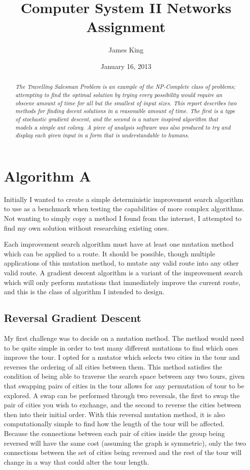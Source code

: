 \documentclass[a4paper,11pt]{article}
\title{Computer System II Networks Assignment}
\date{January 16, 2013}
\author{James King}
\begin{document}
\maketitle

\begin{abstract}
\emph{The Travelling Salesman Problem is an example of the NP-Complete class of
problems; attempting to find the optimal solution by trying every possibility
would require an obscene amount of time for all but the smallest of input
sizes. This report describes two methods for finding decent solutions in a 
reasonable amount of time. The first is a type of stochastic gradient descent,
and the second is a nature inspired algorithm that models a simple ant colony.
A piece of analysis software was also produced to try and display each given
input in a form that is understandable to humans.}
\end{abstract}

\section{Algorithm A}
Initially I wanted to create a simple deterministic improvement search
algorithm to use as a benchmark when testing the capabilities of more complex
algorithms. Not wanting to simply copy a method I found from the internet, I
attempted to find my own solution without researching existing ones.

Each improvement search algorithm must have at least one mutation method which
can be applied to a route. It should be possible, though multiple applications
of this mutation method, to mutate any valid route into any other valid route.
A gradient descent algorithm is a variant of the improvement search which will
only perform mutations that immediately improve the current route, and this is
the class of algorithm I intended to design.

\subsection{Reversal Gradient Descent}
My first challenge was to decide on a mutation method. The method would need to
be quite simple in order to test many different mutations to find which ones
improve the tour. I opted for a mutator which selects two cities in the tour
and reverses the ordering of all cities between them. This method satisfies the
condition of being able to traverse the search space between any two tours,
given that swapping pairs of cities in the tour allows for any permutation of
tour to be explored. A swap can be performed through two reversals, the first
to swap the pair of cities you wish to exchange, and the second to reverse the
cities between then into their initial order. With this reversal mutation
method, it is also computationally simple to find how the length of the tour
will be affected. Because the connections between each pair of cities inside
the group being reversed will have the same cost (assuming the graph is
symmetric), only the two connections between the set of cities being reversed
and the rest of the tour will change in a way that could alter the tour length.
\end{document}
